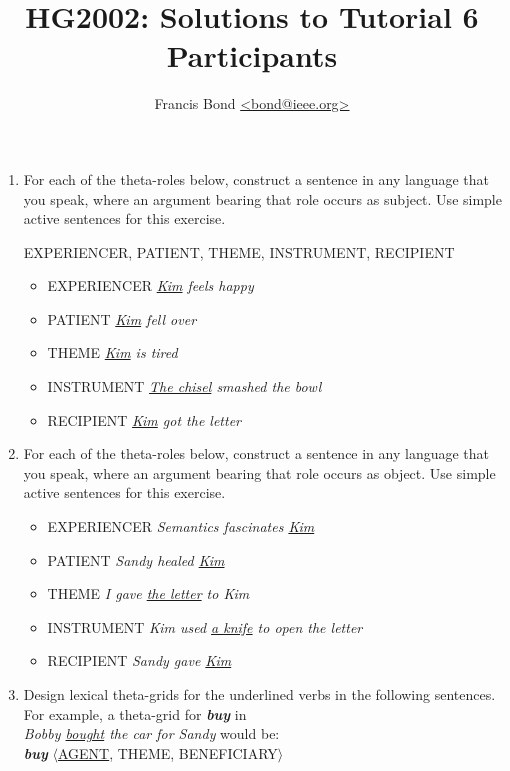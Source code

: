 \documentclass[a4paper]{article}
\title{\vspace*{-30mm}HG2002:  Solutions to Tutorial 6\\  Participants}
\author{Francis Bond \url{<bond@ieee.org>}}
\date{}%
\newcommand{\lex}[1]{\textbf{\textit{#1}}}
\newcommand{\eng}[1]{\textit{#1}}
\newcommand{\ul}[1]{\uline{#1}}
\begin{document}
\maketitle

\begin{enumerate}


\item For each of the theta-roles below, construct a sentence in any
  language that you speak, where an argument bearing that role occurs
  as subject. Use simple active sentences for this exercise.

  EXPERIENCER, PATIENT, THEME, INSTRUMENT, RECIPIENT

  \begin{itemize}
  \item EXPERIENCER   \eng{\ul{Kim} feels happy}
  \item PATIENT   \eng{\ul{Kim} fell over}
  \item THEME   \eng{\ul{Kim} is tired}
  \item INSTRUMENT   \eng{\ul{The chisel} smashed the bowl}
  \item RECIPIENT   \eng{\ul{Kim} got the letter}
  \end{itemize}


\item For each of the theta-roles below, construct a sentence in any
  language that you speak, where an argument bearing that role occurs
  as object. Use simple active sentences for this exercise.

 \begin{itemize}
  \item EXPERIENCER   \eng{Semantics fascinates \ul{Kim}}
  \item PATIENT   \eng{Sandy healed \ul{Kim}}
  \item THEME   \eng{I gave \ul{the letter} to Kim}
  \item INSTRUMENT   \eng{Kim used \ul{a knife} to open the letter}
  \item RECIPIENT   \eng{Sandy gave \ul{Kim}}
  \end{itemize}


\item Design lexical theta-grids for the underlined verbs in the
  following sentences. For example, a theta-grid for \lex{buy} in
  \\ \textit{Bobby \ul{bought} the car for Sandy} would be: 
  \\ \lex{buy} $\langle$\ul{AGENT}, THEME, BENEFICIARY$\rangle$


\end{enumerate}
\end{document}
